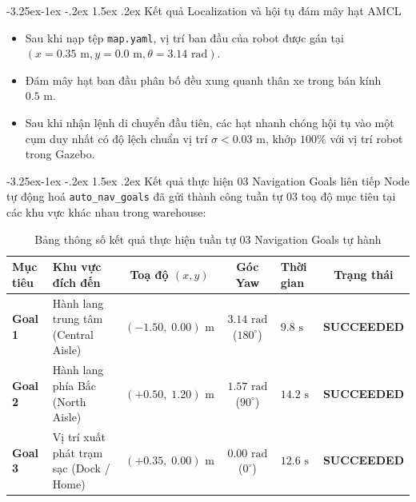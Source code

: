 \documentclass[11pt,a4paper]{article}
\makeatletter
\renewcommand{\subsection}{\@startsection{subsection}{2}{\z@}%
  {-3.25ex\@plus -1ex \@minus -.2ex}%
  {1.5ex \@plus .2ex}%
  {\normalfont\large\bfseries\color{secondary}}}
\makeatother
\begin{document}
\subsection{Kết quả Localization và hội tụ đám mây hạt AMCL}
\begin{itemize}
  \item Sau khi nạp tệp \texttt{map.yaml}, vị trí ban đầu của robot được gán tại $(x=0.35\text{ m}, y=0.0\text{ m}, \theta=3.14\text{ rad})$.
  \item Đám mây hạt ban đầu phân bố đều xung quanh thân xe trong bán kính $0.5\text{ m}$.
  \item Sau khi nhận lệnh di chuyển đầu tiên, các hạt nhanh chóng hội tụ vào một cụm duy nhất có độ lệch chuẩn vị trí $\sigma < 0.03\text{ m}$, khớp $100\%$ với vị trí robot trong Gazebo.
\end{itemize}

\subsection{Kết quả thực hiện 03 Navigation Goals liên tiếp}
Node tự động hoá \texttt{auto\_nav\_goals} đã gửi thành công tuần tự 03 toạ độ mục tiêu tại các khu vực khác nhau trong warehouse:

\begin{table}[H]
\centering
\small
\begin{tabularx}{\textwidth}{p{1.8cm}Xccp{2.0cm}c}
\toprule
\textbf{\color{primary}Mục tiêu} & \textbf{\color{primary}Khu vực đích đến} & \textbf{\color{primary}Toạ độ $(x, y)$} & \textbf{\color{primary}Góc Yaw} & \textbf{\color{primary}Thời gian} & \textbf{\color{primary}Trạng thái} \\
\midrule
\textbf{Goal 1} & Hành lang trung tâm (Central Aisle) & $(-1.50, \; 0.00)\text{ m}$ & $3.14\text{ rad}$ ($180^\circ$) & $9.8\text{ s}$ & \textbf{\color{commentgreen}SUCCEEDED} \\
\rowcolor{boxbg}
\textbf{Goal 2} & Hành lang phía Bắc (North Aisle) & $(+0.50, \; 1.20)\text{ m}$ & $1.57\text{ rad}$ ($90^\circ$) & $14.2\text{ s}$ & \textbf{\color{commentgreen}SUCCEEDED} \\
\textbf{Goal 3} & Vị trí xuất phát trạm sạc (Dock / Home) & $(+0.35, \; 0.00)\text{ m}$ & $0.00\text{ rad}$ ($0^\circ$) & $12.6\text{ s}$ & \textbf{\color{commentgreen}SUCCEEDED} \\
\bottomrule
\end{tabularx}
\caption{Bảng thông số kết quả thực hiện tuần tự 03 Navigation Goals tự hành}
\label{tab:goals_results}
\end{table}
\end{document}
